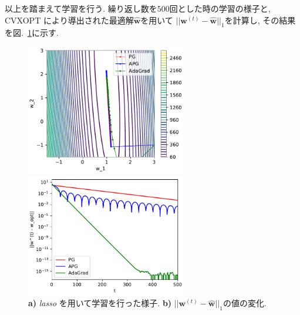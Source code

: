 \documentclass[a4paper,10pt]{jsarticle}
\begin{document}
以上を踏まえて学習を行う.
繰り返し数を$500$回とした時の学習の様子と,
CVXOPT により導出された最適解$\hat{\bm{w}}$を用いて
$||\bm{w}^{(t)} - \hat{\bm{w}}||_1$を計算し,
その結果を図.~\ref{img:lasso-adagrad}に示す.
\begin{figure}[htbp]
 \begin{minipage}{0.5\hsize}
  \begin{center}
   \includegraphics[width=7cm]{figs/p2_lasso_result_pg-apg-adagrad.pdf}
  \end{center}
  \vspace{-0.5cm}
  \subcaption{}
 \end{minipage}
 \begin{minipage}{0.5\hsize}
  \begin{center}
   \includegraphics[width=7cm]{figs/p2_lasso_dist_adagrad.pdf}
  \end{center}
  \vspace{-0.5cm}
  \subcaption{}
 \end{minipage}
 \caption{\textbf{a)} \textit{lasso} を用いて学習を行った様子.
 \textbf{b)} $||\bm{w}^{(t)} - \hat{\bm{w}}||_1$の値の変化.
 }
 \label{img:lasso-adagrad}
\end{figure}
\end{document}
